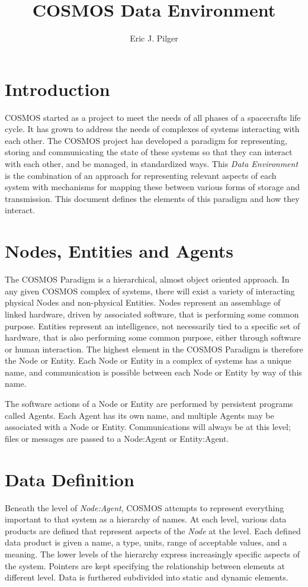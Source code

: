 \documentclass[10pt,letterpaper]{report}
\title{COSMOS Data Environment}
\author{Eric J. Pilger}
\begin{document}
\maketitle
\tableofcontents

\chapter{Introduction}
COSMOS started as a project to meet the needs of all phases of a spacecrafts life cycle. It has grown to address the needs of complexes of systems interacting with each other. The COSMOS project has developed a paradigm for representing, storing and communicating the state of these systems so that they can interact with each other, and be managed, in standardized ways. This \textit{Data Environment} is the combination of an approach for representing relevant aspects of each system with mechanisms for mapping these between various forms of storage and transmission. This document defines the elements of this paradigm and how they interact.

\chapter{Nodes, Entities and Agents}
The COSMOS Paradigm is a hierarchical, almost object oriented approach. In any given COSMOS complex of systems, there will exist a variety of interacting physical Nodes and non-physical Entities. Nodes represent an assemblage of linked hardware, driven by associated software, that is performing some common purpose. Entities represent an intelligence, not necessarily tied to a specific set of hardware, that is also performing some common purpose, either through software or human interaction. The highest element in the COSMOS Paradigm is therefore the Node or Entity. Each Node or Entity in a complex of systems has a unique name, and communication is possible between each Node or Entity by way of this name.

The software actions of a Node or Entity are performed by persistent programs called Agents. Each Agent has its own name, and multiple Agents may be associated with a Node or Entity. Communications will always be at this level; files or messages are passed to a Node:Agent or Entity:Agent.

\chapter{Data Definition}
Beneath the level of \textit{Node:Agent}, COSMOS attempts to represent everything important to that system as a hierarchy of names. At each level, various data products are defined that represent aspects of the \textit{Node} at the level. Each defined data product is given a name, a type, units, range of acceptable values, and a meaning. The lower levels of the hierarchy express increasingly specific aspects of the system. Pointers are kept specifying the relationship between elements at different level. Data is furthered subdivided into static and dynamic elements.
\end{document}
